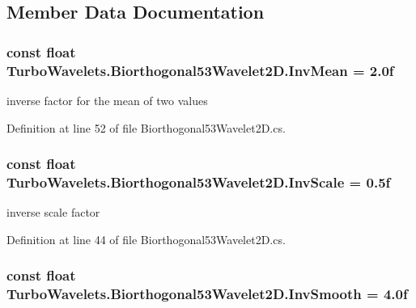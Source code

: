 \subsection{\-Member \-Data \-Documentation}
\hypertarget{class_turbo_wavelets_1_1_biorthogonal53_wavelet2_d_a60d0110965f0ac833e932ad39b3d6f46}{
\subsubsection[{\-Inv\-Mean}]{\setlength{\rightskip}{0pt plus 5cm}const float {\bf \-Turbo\-Wavelets.\-Biorthogonal53\-Wavelet2\-D.\-Inv\-Mean} = 2.\-0f}}\label{class_turbo_wavelets_1_1_biorthogonal53_wavelet2_d_a60d0110965f0ac833e932ad39b3d6f46}


inverse factor for the mean of two values 



\-Definition at line 52 of file \-Biorthogonal53\-Wavelet2\-D.\-cs.

\hypertarget{class_turbo_wavelets_1_1_biorthogonal53_wavelet2_d_a02e708dc75d423093b1a022cc93f0388}{
\subsubsection[{\-Inv\-Scale}]{\setlength{\rightskip}{0pt plus 5cm}const float {\bf \-Turbo\-Wavelets.\-Biorthogonal53\-Wavelet2\-D.\-Inv\-Scale} = 0.\-5f}}\label{class_turbo_wavelets_1_1_biorthogonal53_wavelet2_d_a02e708dc75d423093b1a022cc93f0388}


inverse scale factor 



\-Definition at line 44 of file \-Biorthogonal53\-Wavelet2\-D.\-cs.

\hypertarget{class_turbo_wavelets_1_1_biorthogonal53_wavelet2_d_aef40af813a0abea998b61fdb7ce34f5d}{
\subsubsection[{\-Inv\-Smooth}]{\setlength{\rightskip}{0pt plus 5cm}const float {\bf \-Turbo\-Wavelets.\-Biorthogonal53\-Wavelet2\-D.\-Inv\-Smooth} = 4.\-0f}}\label{class_turbo_wavelets_1_1_biorthogonal53_wavelet2_d_aef40af813a0abea998b61fdb7ce34f5d}


